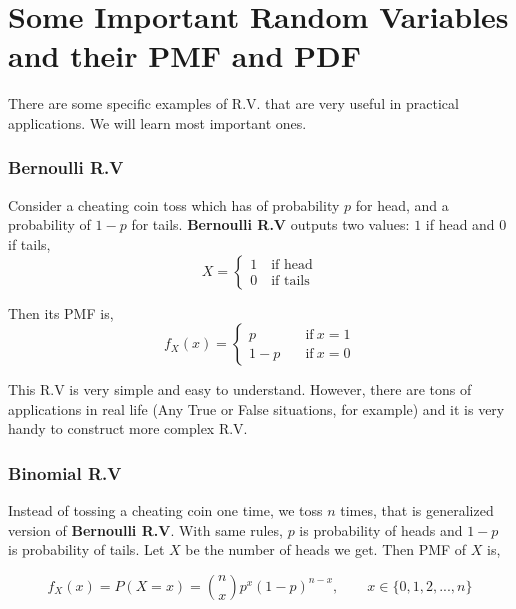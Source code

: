 

\section{Some Important Random Variables and their PMF and PDF}
There are some specific examples of R.V. that are very useful in practical applications. We will learn most important ones.

\subsubsection*{Bernoulli R.V}
Consider a cheating coin toss which has of probability $p$ for head, and a probability of $1-p$ for tails. \textbf{Bernoulli R.V} outputs two values: $1$ if head and $0$ if tails,
\[X =\begin{cases}
        1 \quad \text{if head} \\
        0 \quad \text{if tails}
\end{cases} \]

Then its PMF is,
\[f_X(x) =\begin{cases}
    p \quad &\text{if} \ x=1\\
    1-p \quad &\text{if} \ x=0
\end{cases} \]

This R.V is very simple and easy to understand. However, there are tons of applications in real life (Any True or False situations, for example) and it is very handy to construct more complex R.V.

\subsubsection*{Binomial R.V}
Instead of tossing a cheating coin one time, we toss $n$ times, that is generalized version of \textbf{Bernoulli R.V}. With same rules, $p$ is probability of heads and $1-p$ is probability of tails. Let $X$ be the number of heads we get. Then PMF of $X$ is,

\[f_X(x) = P(X = x) =  \binom{n}{x}p^x (1-p)^{n-x}, \qquad x \in \{0,1,2,...,n \} \]


